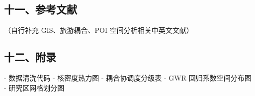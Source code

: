 \subsection*{十一、参考文献}
（自行补充 GIS、旅游耦合、POI 空间分析相关中英文文献）

\subsection*{十二、附录}
- 数据清洗代码
- 核密度热力图
- 耦合协调度分级表
- GWR 回归系数空间分布图
- 研究区网格划分图
